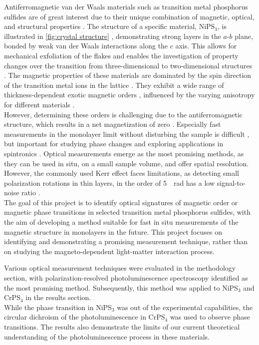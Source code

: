 \documentclass[
	twoside,
	parskip=half,
	a4paper,
]{scrbook}
\begin{document}
Antiferromagnetic van der Waals materials such as transition metal phosphorus sulfides are of great interest due to their unique combination of magnetic, optical, and structural properties \cite{MPX_review}. 
The structure of a specific material, NiPS$_3$, is illustrated in \autoref{fig:crystal structure} \cite{NiPS3_coherent}, demonstrating strong layers in the $a$-$b$ plane, bonded by weak van der Waals interactions along the $c$ axis.
This allows for mechanical exfoliation of the flakes and enables the investigation of property changes over the transition from three-dimensional to two-dimensional structures \cite{MPX_review}.
The magnetic properties of these materials are dominated by the spin direction of the transition metal ions in the lattice \cite{MPS_magnetism}.
They exhibit a wide range of thickness-dependent exotic magnetic orders \cite{AFM_review}, influenced by the varying anisotropy for different materials \cite{MPS_magnetism, CrPS4_magnetic}.\\
However, determining these orders is challenging due to the antiferromagnetic structure, which results in a net magnetization of zero \cite{MPX_review,MPS_magnetism,afm}.
Especially fast measurements in the monolayer limit without disturbing the sample is difficult \cite{AFM_review, CrPS4_magnetic}, but important for studying phase changes and exploring applications in spintronics \cite{AFM_review}.
Optical measurements emerge as the most promising methods, as they can be used in situ, on a small sample volume, and offer spatial resolution. 
However, the commonly used Kerr effect faces limitations, as detecting small polarization rotations in thin layers, in the order of \SI{5}{\mu rad} has a low signal-to-noise ratio \cite{AFM_review}. \\
The goal of this project is to identify optical signatures of magnetic order or magnetic phase transitions in selected transition metal phosphorus sulfides, with the aim of developing a method suitable for fast in situ measurements of the magnetic structure in monolayers in the future.
This project focuses on identifying and demonstrating a promising measurement technique, rather than on studying the magneto-dependent light-matter interaction process.

Various optical measurement techniques were evaluated in the methodology section, with polarization-resolved photoluminescence spectroscopy identified as the most promising method.
Subsequently, this method was applied to NiPS$_3$ and CrPS$_4$ in the results section.\\
While the phase transition in NiPS$_3$ was out of the experimental capabilities, the circular dichroism of the photoluminescence in CrPS$_4$ was used to observe phase transitions.
The results also demonstrate the limits of our current theoretical understanding of the photoluminescence process in these materials. 
\end{document}
